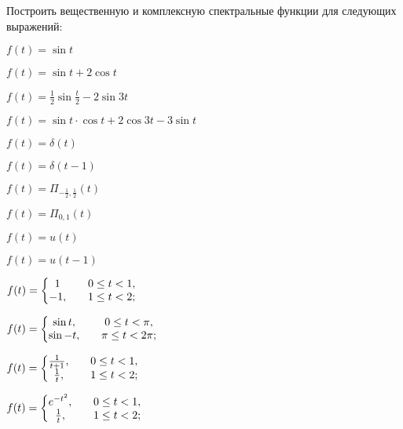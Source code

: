 	\vspace{15pt}
	Построить вещественную и комплексную спектральные функции для следующих выражений:

	\begin{multicols}{2}
		\begin{enumtasks}

			\item \( f(t) = \sin{t} \)
			\item \( f(t) = \sin{t} + 2\cos{t} \)
			\item \( f(t) = \frac{1}{2} \sin{\frac{t}{2}} - 2 \sin{3t} \)
			\item \( f(t) = \sin{t} \cdot \cos{t} + 2\cos{3t} - 3\sin{t} \)

		\end{enumtasks}
	\end{multicols}

	\vspace{10pt}

	\begin{multicols}{3}
		\begin{enumtasks}

			\item \( f(t) = \delta(t) \)
			\item \( f(t) = \delta(t-1) \)
			\item \( f(t) = \Pi_{-\frac{1}{2}, \frac{1}{2}}(t) \)
			\item \( f(t) = \Pi_{0, 1}(t) \)
			\item \( f(t) = u(t) \)
			\item \( f(t) = u(t-1) \)

		\end{enumtasks}
	\end{multicols}

	\vspace{10pt}

	\begin{multicols}{2}
		\begin{enumtasks}

			\item \( f(t) = \left\lbrace \begin{matrix}  1 && 0 \le t < 1, \\ -1, && 1 \le t < 2;  \end{matrix} \right. \)
			\item \( f(t) = \left\lbrace \begin{matrix}  \sin{t}, && 0 \le t < \pi, \\ \sin{-t}, && \pi \le t < 2\pi;  \end{matrix} \right. \)
			\item \( f(t) = \left\lbrace \begin{matrix}  \frac{1}{t+1}, && 0 \le t < 1, \\ \frac{1}{t}, && 1 \le t < 2;  \end{matrix} \right. \)
			\item \( f(t) = \left\lbrace \begin{matrix}  e^{-t^2}, && 0 \le t < 1, \\ \frac{1}{t}, && 1 \le t < 2;  \end{matrix} \right. \)

		\end{enumtasks}
	\end{multicols}
